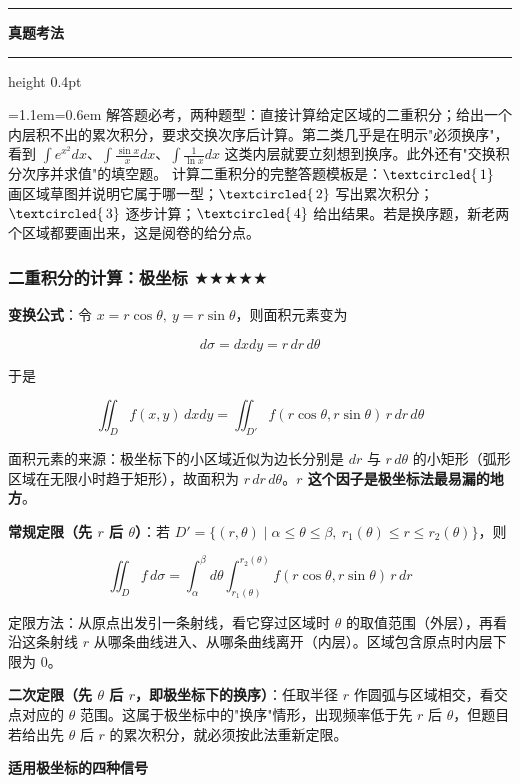 \documentclass[11pt,openany,UTF8]{ctexbook}
\newcommand{\circled}[1]{\textcircled{\scriptsize\,#1}}
\newcommand{\callouthead}[2]{%
  \par\addvspace{7pt}\noindent
  {\color{#1}\rule[-0.15em]{3pt}{1.05em}}\hspace{0.5em}%
  {\bfseries\color{#1}#2}\par\nobreak\vspace{-0.35em}%
  {\color{rulesep}\hrule height 0.4pt}\nobreak\vspace{0.45em}%
  \begingroup\small\setlength{\parindent}{0pt}%
  \leftskip=1.1em\rightskip=0.6em\noindent\ignorespaces}
\newcommand{\calloutend}{\par\endgroup\addvspace{7pt}}
\newenvironment{callexam}[1]{\callouthead{exambar}{#1}}{\calloutend}
\begin{document}
\begin{callexam}{真题考法}
解答题必考，两种题型：直接计算给定区域的二重积分；给出一个内层积不出的累次积分，要求交换次序后计算。第二类几乎是在明示"必须换序"，看到 $\int e^{x^{2}}dx$、$\int\frac{\sin x}{x}dx$、$\int\frac{1}{\ln x}dx$ 这类内层就要立刻想到换序。此外还有"交换积分次序并求值"的填空题。 计算二重积分的完整答题模板是：$\circled{1}$ 画区域草图并说明它属于哪一型；$\circled{2}$ 写出累次积分；$\circled{3}$ 逐步计算；$\circled{4}$ 给出结果。若是换序题，新老两个区域都要画出来，这是阅卷的给分点。

\end{callexam}

\subsubsection{二重积分的计算：极坐标 $\bigstar$$\bigstar$$\bigstar$$\bigstar$$\bigstar$}

\textbf{变换公式}：令 $x=r\cos\theta,\ y=r\sin\theta$，则面积元素变为

\[d\sigma=dxdy=r\,dr\,d\theta\]

于是

\[\iint_{D}f(x,y)\,dxdy=\iint_{D'}f(r\cos\theta,r\sin\theta)\,r\,dr\,d\theta\]

面积元素的来源：极坐标下的小区域近似为边长分别是 $dr$ 与 $r\,d\theta$ 的小矩形（弧形区域在无限小时趋于矩形），故面积为 $r\,dr\,d\theta$。\textbf{$r$ 这个因子是极坐标法最易漏的地方}。

\textbf{常规定限（先 $r$ 后 $\theta$）}：若 $D'=\{(r,\theta)\mid \alpha\le\theta\le\beta,\ r_1(\theta)\le r\le r_2(\theta)\}$，则

\[\iint_{D}f\,d\sigma=\int_{\alpha}^{\beta}d\theta\int_{r_1(\theta)}^{r_2(\theta)}f(r\cos\theta,r\sin\theta)\,r\,dr\]

定限方法：从原点出发引一条射线，看它穿过区域时 $\theta$ 的取值范围（外层），再看沿这条射线 $r$ 从哪条曲线进入、从哪条曲线离开（内层）。区域包含原点时内层下限为 $0$。

\textbf{二次定限（先 $\theta$ 后 $r$，即极坐标下的换序）}：任取半径 $r$ 作圆弧与区域相交，看交点对应的 $\theta$ 范围。这属于极坐标中的"换序"情形，出现频率低于先 $r$ 后 $\theta$，但题目若给出先 $\theta$ 后 $r$ 的累次积分，就必须按此法重新定限。

\textbf{适用极坐标的四种信号}
\end{document}
